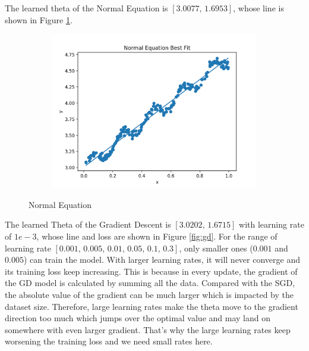 \documentclass[11pt]{article}
\begin{document}
\begin{enumerate}
The learned theta of the Normal Equation is $[3.0077,\, 1.6953]$, whose line is shown in Figure \ref{fig:ne}.
\medskip


\begin{figure}[!h]
    \centering
    \begin{subfigure}[b]{0.4\linewidth}
      \includegraphics[width=\linewidth]{figures/normal.png}
    \end{subfigure}
    \caption{Normal Equation}
    \label{fig:ne}
\end{figure}

The learned Theta of the Gradient Descent is $[3.0202,\, 1.6715]$ with learning rate of $1e-3$, whose line and loss are shown in Figure \ref{fig:gd}. For the range of learning rate $[0.001,\, 0.005,\, 0.01,\, 0.05,\, 0.1,\, 0.3]$, only smaller ones ($0.001$ and $0.005$) can train the model. With larger learning rates, it will never converge and its training loss keep increasing. This is because in every update, the gradient of the GD model is calculated by summing all the data. Compared with the SGD, the absolute value of the gradient can be much larger which is impacted by the dataset size. Therefore, large learning rates make the theta move to the gradient direction too much which jumps over the optimal value and may land on somewhere with even larger gradient. That's why the large learning rates keep worsening the training loss and we need small rates here.
\medskip



\end{enumerate}
\end{document}
